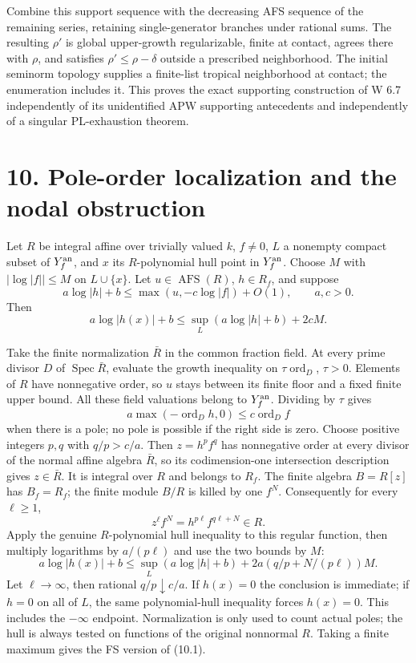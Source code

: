 \documentclass[
  10pt,
]{article}
\begin{document}
Combine this support sequence with the decreasing AFS sequence of the
remaining series, retaining single-generator branches under rational
sums. The resulting \(\rho'\) is global upper-growth regularizable,
finite at contact, agrees there with \(\rho\), and satisfies
\(\rho'\le\rho-\delta\) outside a prescribed neighborhood. The initial
seminorm topology supplies a finite-list tropical neighborhood at
contact; the enumeration includes it. This proves the exact supporting
construction of W 6.7 independently of its unidentified APW supporting
antecedents and independently of a singular PL-exhaustion theorem.

\section{10. Pole-order localization and the nodal
obstruction}\label{pole-order-localization-and-the-nodal-obstruction}

Let \(R\) be integral affine over trivially valued \(k\), \(f\ne0\),
\(L\) a nonempty compact subset of \(Y_f^{\rm an}\), and \(x\) its
\(R\)-polynomial hull point in \(Y_f^{\rm an}\). Choose \(M\) with
\(|\log|f||\le M\) on \(L\cup\{x\}\). Let \(u\in\operatorname{AFS}(R)\),
\(h\in R_f\), and suppose
\[a\log|h|+b\le\max(u,-c\log|f|)+O(1),\qquad a,c>0.\] Then
\[a\log|h(x)|+b\le\sup_L(a\log|h|+b)+2cM.\tag{10.1}\]

Take the finite normalization \(\bar R\) in the common fraction field.
At every prime divisor \(D\) of \(\operatorname{Spec}\bar R\), evaluate
the growth inequality on \(\tau\operatorname{ord}_D\), \(\tau>0\).
Elements of \(R\) have nonnegative order, so \(u\) stays between its
finite floor and a fixed finite upper bound. All these field valuations
belong to \(Y_f^{\rm an}\). Dividing by \(\tau\) gives
\[a\max(-\operatorname{ord}_D h,0)\le c\operatorname{ord}_D f\] when
there is a pole; no pole is possible if the right side is zero. Choose
positive integers \(p,q\) with \(q/p>c/a\). Then \(z=h^pf^q\) has
nonnegative order at every divisor of the normal affine algebra
\(\bar R\), so its codimension-one intersection description gives
\(z\in\bar R\). It is integral over \(R\) and belongs to \(R_f\). The
finite algebra \(B=R[z]\) has \(B_f=R_f\); the finite module \(B/R\) is
killed by one \(f^N\). Consequently for every \(\ell\ge1\),
\[z^\ell f^N=h^{p\ell}f^{q\ell+N}\in R.\] Apply the genuine
\(R\)-polynomial hull inequality to this regular function, then multiply
logarithms by \(a/(p\ell)\) and use the two bounds by \(M\):
\[a\log|h(x)|+b\le\sup_L(a\log|h|+b)
                         +2a(q/p+N/(p\ell))M.\] Let \(\ell\to\infty\),
then rational \(q/p\downarrow c/a\). If \(h(x)=0\) the conclusion is
immediate; if \(h=0\) on all of \(L\), the same polynomial-hull
inequality forces \(h(x)=0\). This includes the \(-\infty\) endpoint.
Normalization is only used to count actual poles; the hull is always
tested on functions of the original nonnormal \(R\). Taking a finite
maximum gives the FS version of (10.1).
\end{document}
